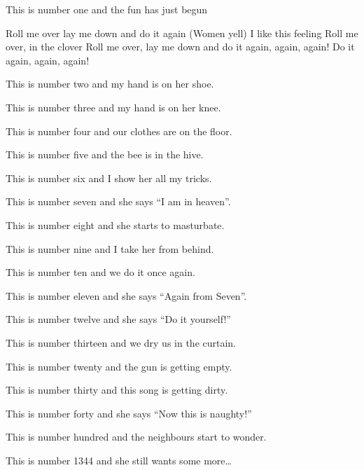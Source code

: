 \beginverse
This is number one and the fun has just begun
\endverse

\beginchorus
Roll me over lay me down and do it again
(Women yell) I like this feeling
Roll me over, in the clover
Roll me over, lay me down and do it again, again, again!
Do it again, again, again!
\endchorus

\beginverse
This is number two and my hand is on her shoe.
\endverse

\beginverse
This is number three and my hand is on her knee.
\endverse

\beginverse
This is number four and our clothes are on the floor.
\endverse

\beginverse
This is number five and the bee is in the hive.
\endverse

\beginverse
This is number six and I show her all my tricks.
\endverse

\beginverse
This is number seven and she says ``I am in heaven''.
\endverse

\beginverse
This is number eight and she starts to masturbate.
\endverse

\beginverse
This is number nine and I take her from behind.
\endverse

\beginverse
This is number ten and we do it once again.
\endverse

\beginverse
This is number eleven and she says ``Again from Seven''.
\endverse

\beginverse
This is number twelve and she says ``Do it yourself!''
\endverse

\beginverse
This is number thirteen and we dry us in the curtain.
\endverse

\beginverse
This is number twenty and the gun is getting empty.
\endverse

\beginverse
This is number thirty and this song is getting dirty.
\endverse

\beginverse
This is number forty and she says ``Now this is naughty!''
\endverse

\beginverse
This is number hundred and the neighbours start to wonder.
\endverse

\beginverse
This is number 1344 and she still wants some more\dots
\endverse
\endsong
